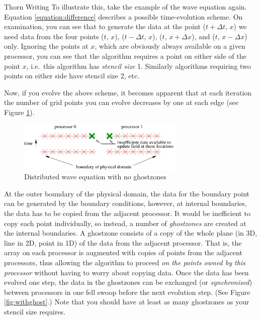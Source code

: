 \begin{cactuspart}{Thorn Writing}
To illustrate this, take the example of the wave equation again.
Equation \ref{equation:difference} describes a possible time-evolution
scheme.  On examination, you can see that to generate the data at the
point ($t+\Delta t$, $x$) we need data from the four points ($t$,
$x$), ($t-\Delta t$, $x$), ($t$, $x+\Delta x$), and ($t$, $x-\Delta x$)
only.  Ignoring the points at $x$, which are obviously always
available on a given processor, you can see that the algorithm
requires a point on either side of the point $x$, i.e.\ this algorithm
has \textit{stencil size} 1.  Similarly algorithms requiring two points
on either side have stencil size 2, etc.

Now, if you evolve the above scheme, it becomes apparent that at each
iteration the number of grid points you can evolve decreases by one at
each edge (see Figure \ref{fig:noghost}).

\begin{figure}[ht]
\begin{center}
\includegraphics[angle=0,width=8cm]{1dnoghost}
\end{center}
\caption{Distributed wave equation with no ghostzones}
\label{fig:noghost}
\end{figure}

At the outer boundary of the physical domain, the data for the boundary
point can be generated by the boundary conditions, however, at internal
boundaries, the data has to be copied from the adjacent processor.  It
would be inefficient to copy each point individually, so instead, a
number of \textit{ghostzones} are created at the internal boundaries.  A
ghostzone consists of a copy of the whole plane (in 3D, line in 2D,
point in 1D) of the data from the adjacent processor.  That is, the array
on each processor is augmented with copies of points from the adjacent
processors, thus allowing the algorithm to proceed \textit{on the points
owned by this processor} without having to worry about copying data.
Once the data has been evolved one step, the data in the ghostzones
can be exchanged (or \textit{synchronised}) between processors in one
fell swoop before the next evolution step.  (See Figure
\ref{fig:withghost}.)  Note that you should have at least as many
ghostzones as your stencil size requires.


\end{cactuspart}
